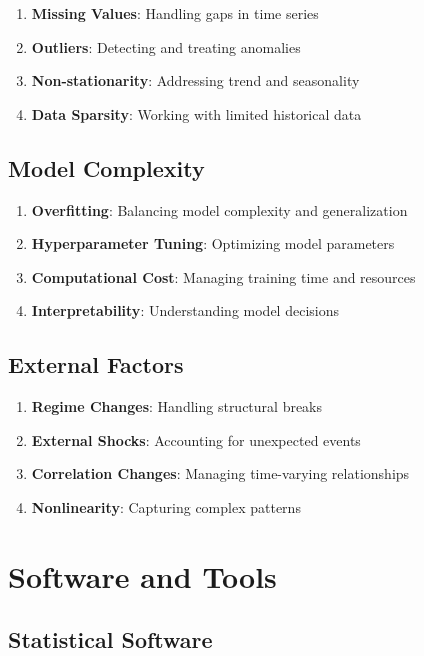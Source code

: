\documentclass[11pt,a4paper]{article}
\begin{document}
\begin{enumerate}
\item \textbf{Missing Values}: Handling gaps in time series
\item \textbf{Outliers}: Detecting and treating anomalies
\item \textbf{Non-stationarity}: Addressing trend and seasonality
\item \textbf{Data Sparsity}: Working with limited historical data
\end{enumerate}

\subsection{Model Complexity}

\begin{enumerate}
\item \textbf{Overfitting}: Balancing model complexity and generalization
\item \textbf{Hyperparameter Tuning}: Optimizing model parameters
\item \textbf{Computational Cost}: Managing training time and resources
\item \textbf{Interpretability}: Understanding model decisions
\end{enumerate}

\subsection{External Factors}

\begin{enumerate}
\item \textbf{Regime Changes}: Handling structural breaks
\item \textbf{External Shocks}: Accounting for unexpected events
\item \textbf{Correlation Changes}: Managing time-varying relationships
\item \textbf{Nonlinearity}: Capturing complex patterns
\end{enumerate}

\section{Software and Tools}

\subsection{Statistical Software}
\end{document}
